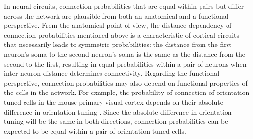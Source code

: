 


In neural circuits, connection probabilities that are equal within pairs but differ across the network are plausible from both an anatomical and a functional perspective. From the anatomical point of view, the distance dependency of connection probabilities mentioned above is a characteristic of cortical circuits that necessarily leads to symmetric probabilities: the distance from the first neuron's soma to the second neuron's soma is the same as the distance from the second to the first, resulting in equal probabilities within a pair of neurons when inter-neuron distance determines connectivity. Regarding the functional perspective, connection probabilities may also depend on functional properties of the cells in the network. For example, the probability of connection of orientation tuned cells in the mouse primary visual cortex depends on their absolute difference in orientation tuning \cite{Lee2016, Ko2011}. Since the absolute difference in orientation tuning will be the same in both directions, connection probabilities can be expected to be equal within a pair of orientation tuned cells.


